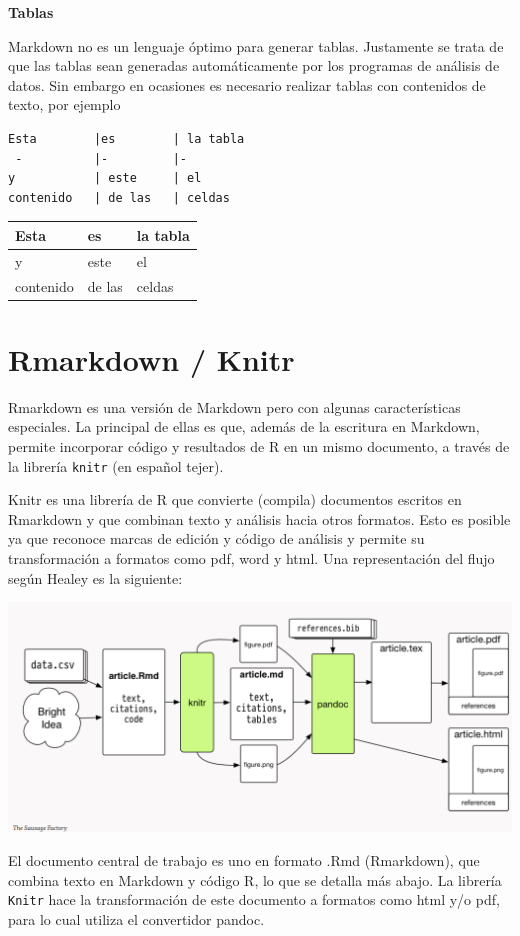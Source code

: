 \documentclass[
  11pt,
]{book}
\begin{document}
\textbf{Tablas}

Markdown no es un lenguaje óptimo para generar tablas. Justamente se trata de que las tablas sean generadas automáticamente por los programas de análisis de datos. Sin embargo en ocasiones es necesario realizar tablas con contenidos de texto, por ejemplo

\begin{verbatim}
Esta        |es        | la tabla
 -          |-         |-
y           | este     | el
contenido   | de las   | celdas
\end{verbatim}

\begin{longtable}[]{@{}lll@{}}
\toprule
Esta & es & la tabla\tabularnewline
\midrule
\endhead
y & este & el\tabularnewline
contenido & de las & celdas\tabularnewline
\bottomrule
\end{longtable}

\hypertarget{rmarkdown-knitr}{%
\section{Rmarkdown / Knitr}\label{rmarkdown-knitr}}

Rmarkdown es una versión de Markdown pero con algunas características especiales. La principal de ellas es que, además de la escritura en Markdown, permite incorporar código y resultados de R en un mismo documento, a través de la librería \texttt{knitr} (en español tejer).

Knitr es una librería de R que convierte (compila) documentos escritos en Rmarkdown y que combinan texto y análisis hacia otros formatos. Esto es posible ya que reconoce marcas de edición y código de análisis y permite su transformación a formatos como pdf, word y html. Una representación del flujo según Healey es la siguiente:

\includegraphics{images/healeysworkflow.png}

El documento central de trabajo es uno en formato .Rmd (Rmarkdown), que combina texto en Markdown y código R, lo que se detalla más abajo. La librería \texttt{Knitr} hace la transformación de este documento a formatos como html y/o pdf, para lo cual utiliza el convertidor pandoc.
\end{document}
